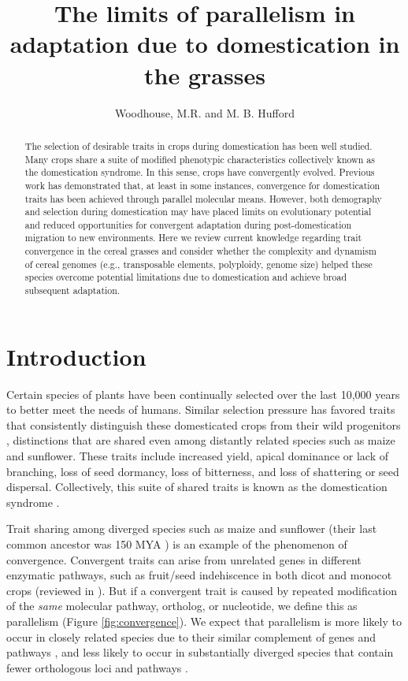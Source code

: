 \documentclass[12pt]{article}
\title{The limits of parallelism in adaptation due to domestication in the grasses}
\author{Woodhouse, M.R. and M. B. Hufford}
\begin{document}
\maketitle

\begin{abstract}
The selection of desirable traits in crops during domestication has been well studied.
Many crops share a suite of modified phenotypic characteristics collectively known as the domestication syndrome.
In this sense, crops have convergently evolved.
Previous work has demonstrated that, at least in some instances, convergence for domestication traits has been achieved through parallel molecular means.
However, both demography and selection during domestication may have placed limits on evolutionary potential and reduced opportunities for convergent adaptation during post-domestication migration to new environments.
Here we review current knowledge regarding trait convergence in the cereal grasses and consider whether the complexity and dynamism of cereal genomes (e.g., transposable elements, polyploidy, genome size) helped these species overcome potential limitations due to domestication and achieve broad subsequent adaptation.
\end{abstract}

\section*{Introduction}
Certain species of plants have been continually selected over the last 10,000 years to better meet the needs of humans.
Similar selection pressure has favored traits that consistently distinguish these domesticated crops from their wild progenitors \citep{Doebley2006}, distinctions that are shared even among distantly related species such as maize and sunflower.
These traits include increased yield, apical dominance or lack of branching, loss of seed dormancy, loss of bitterness, and loss of shattering or seed dispersal.
Collectively, this suite of shared traits is known as the domestication syndrome \citep{Hammer1984}.

Trait sharing among diverged species such as maize and sunflower (their last common ancestor was 150 MYA \citep{Chang2004}) is an example of the phenomenon of convergence. 
Convergent traits can arise from unrelated genes in different enzymatic pathways, such as fruit/seed indehiscence in both dicot and monocot crops (reviewed in \citep{Dong2015}).
But if a convergent trait is caused by repeated modification of the \emph{same} molecular pathway, ortholog, or nucleotide, we define this as parallelism \citep{Rosenblum2014} (Figure \ref{fig:convergence}). 
We expect that parallelism is more likely to occur in closely related species due to their similar complement of genes and pathways \citep{Pickersgill2018}, and less likely to occur in substantially diverged species that contain fewer orthologous loci and pathways \citep{Washburn2016, Pickersgill2018}.
\end{document}
